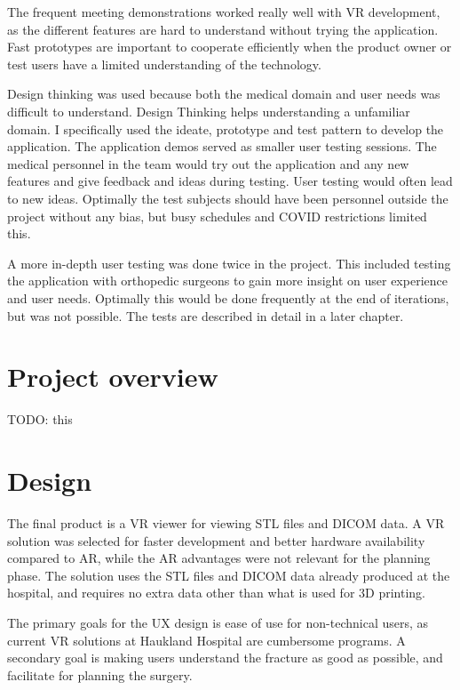 \documentclass[a4paper]{report}
\begin{document}
The frequent meeting demonstrations worked really well with VR development, as the different features are hard to understand without trying the application. Fast prototypes are important to cooperate efficiently when the product owner or test users have a limited understanding of the technology.


Design thinking was used because both the medical domain and user needs was difficult to understand. Design Thinking helps understanding a unfamiliar domain. I specifically used the ideate, prototype and test pattern to develop the application.
The application demos served as smaller user testing sessions. The medical personnel in the team would try out the application and any new features and give feedback and ideas during testing. User testing would often lead to new ideas. Optimally the test subjects should have been personnel outside the project without any bias, but busy schedules and COVID restrictions limited this.

A more in-depth user testing was done twice in the project. This included testing the application with orthopedic surgeons to gain more insight on user experience and user needs. Optimally this would be done frequently at the end of iterations, but was not possible. The tests are described in detail in a later chapter.

\section{Project overview}\label{CodeStructure}
TODO: this

\section{Design}


The final product is a VR viewer for viewing STL files and DICOM data. A VR solution was selected for faster development and better hardware availability compared to AR, while the AR advantages were not relevant for the planning phase.
The solution uses the STL files and DICOM data already produced at the hospital, and requires no extra data other than what is used for 3D printing.

The primary goals for the UX design is ease of use for non-technical users, as current VR solutions at Haukland Hospital are cumbersome programs.
A secondary goal is making users understand the fracture as good as possible, and facilitate for planning the surgery.
\end{document}
